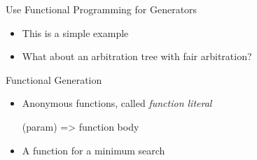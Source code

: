 



\begin{frame}[fragile]{Use Functional Programming for Generators}
\begin{itemize}
\item This is a simple example
\item What about an arbitration tree with fair arbitration?
\end{itemize}
\end{frame}

\begin{frame}[fragile]{Functional Generation}
\begin{itemize}
\item Anonymous functions, called \emph{function literal}
\begin{chisel}
  (param) => function body
\end{chisel}
\item A function for a minimum search
\end{itemize}
\end{frame}

